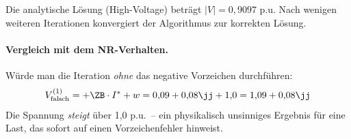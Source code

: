 Die analytische Lösung (High-Voltage) beträgt $|V| = 0{,}9097$ p.u. Nach wenigen weiteren Iterationen konvergiert der Algorithmus zur korrekten Lösung.

\paragraph{Vergleich mit dem NR-Verhalten.} Würde man die Iteration \textit{ohne} das negative Vorzeichen durchführen:
\begin{equation}
	V^{(1)}_{\text{falsch}} = +\ZB \cdot I^* + w = 0{,}09 + 0{,}08\jj + 1{,}0 = 1{,}09 + 0{,}08\jj
\end{equation}
Die Spannung \textit{steigt} über 1{,}0 p.u.\ -- ein physikalisch unsinniges Ergebnis für eine Last, das sofort auf einen Vorzeichenfehler hinweist.

